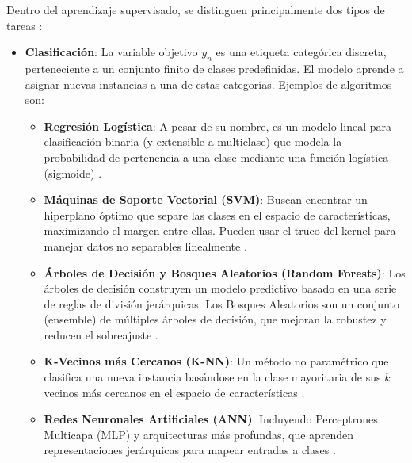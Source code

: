 Dentro del aprendizaje supervisado, se distinguen principalmente dos tipos de tareas \citep{Alpaydin2020}:
\begin{itemize}
    \item \textbf{Clasificación}: La variable objetivo $y_n$ es una etiqueta categórica discreta, perteneciente a un conjunto finito de clases predefinidas. El modelo aprende a asignar nuevas instancias a una de estas categorías.
    Ejemplos de algoritmos son:
    \begin{itemize}
        \item \textbf{Regresión Logística}: A pesar de su nombre, es un modelo lineal para clasificación binaria (y extensible a multiclase) que modela la probabilidad de pertenencia a una clase mediante una función logística (sigmoide) \citep{Cox1958, Hosmer2013}.
        \item \textbf{Máquinas de Soporte Vectorial (SVM)}: Buscan encontrar un hiperplano óptimo que separe las clases en el espacio de características, maximizando el margen entre ellas. Pueden usar el truco del kernel para manejar datos no separables linealmente \citep{Cortes1995, Boser1992}.
        \item \textbf{Árboles de Decisión y Bosques Aleatorios (Random Forests)}: Los árboles de decisión construyen un modelo predictivo basado en una serie de reglas de división jerárquicas. Los Bosques Aleatorios son un conjunto (ensemble) de múltiples árboles de decisión, que mejoran la robustez y reducen el sobreajuste \citep{Breiman1984cart, Breiman2001random}.
        \item \textbf{K-Vecinos más Cercanos (K-NN)}: Un método no paramétrico que clasifica una nueva instancia basándose en la clase mayoritaria de sus $k$ vecinos más cercanos en el espacio de características \citep{Cover1967nearest}.
        \item \textbf{Redes Neuronales Artificiales (ANN)}: Incluyendo Perceptrones Multicapa (MLP) y arquitecturas más profundas, que aprenden representaciones jerárquicas para mapear entradas a clases \citep[e.g.,][]{Rumelhart1986learning, LeCun2015deep}.
    \end{itemize}



\end{itemize}
